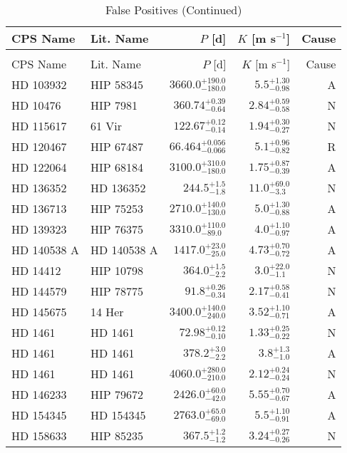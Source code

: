 \begin{longtable*}{llrrr}
\caption{False Positives} \\
\toprule
\midrule

CPS Name & Lit. Name & $P$ [d] & $K$ [m s$^{-1}$] & Cause \\
\endfirsthead
\caption[]{False Positives (Continued)} \\
\toprule
\midrule
CPS Name & Lit. Name & $P$ [d] & $K$ [m s$^{-1}$] & Cause \\
\toprule
\endhead
HD 103932 & HIP 58345 & $3660.0^{+190.0}_{-180.0}$ & $5.5^{+1.30}_{-0.98}$ & A \\
HD 10476 & HIP 7981 & $360.74^{+0.39}_{-0.64}$ & $2.84^{+0.59}_{-0.58}$ & N \\
HD 115617 & 61 Vir & $122.67^{+0.12}_{-0.14}$ & $1.94^{+0.30}_{-0.27}$ & N \\
HD 120467 & HIP 67487 & $66.464^{+0.056}_{-0.066}$ & $5.1^{+0.96}_{-0.82}$ & R \\
HD 122064 & HIP 68184 & $3100.0^{+310.0}_{-180.0}$ & $1.75^{+0.87}_{-0.39}$ & A \\
HD 136352 & HD 136352 & $244.5^{+1.5}_{-1.8}$ & $11.0^{+69.0}_{-3.3}$ & N \\
HD 136713 & HIP 75253 & $2710.0^{+140.0}_{-130.0}$ & $5.0^{+1.30}_{-0.88}$ & A \\
HD 139323 & HIP 76375 & $3310.0^{+110.0}_{-89.0}$ & $4.0^{+1.10}_{-0.97}$ & A \\
HD 140538 A & HD 140538 A & $1417.0^{+23.0}_{-25.0}$ & $4.73^{+0.70}_{-0.72}$ & A \\
HD 14412 & HIP 10798 & $364.0^{+1.5}_{-2.2}$ & $3.0^{+22.0}_{-1.1}$ & N \\
HD 144579 & HIP 78775 & $91.8^{+0.26}_{-0.34}$ & $2.17^{+0.58}_{-0.41}$ & N \\
HD 145675 & 14 Her & $3400.0^{+140.0}_{-240.0}$ & $3.52^{+1.10}_{-0.71}$ & A \\
HD 1461 & HD 1461 & $72.98^{+0.12}_{-0.10}$ & $1.33^{+0.25}_{-0.22}$ & N \\
HD 1461 & HD 1461 & $378.2^{+3.0}_{-2.2}$ & $3.8^{+1.3}_{-1.0}$ & A \\
HD 1461 & HD 1461 & $4060.0^{+280.0}_{-210.0}$ & $2.12^{+0.24}_{-0.24}$ & N \\
HD 146233 & HIP 79672 & $2426.0^{+60.0}_{-42.0}$ & $5.55^{+0.70}_{-0.67}$ & A \\
HD 154345 & HD 154345 & $2763.0^{+65.0}_{-69.0}$ & $5.5^{+1.10}_{-0.91}$ & A \\
HD 158633 & HIP 85235 & $367.5^{+1.2}_{-1.2}$ & $3.24^{+0.27}_{-0.26}$ & N \\

\end{longtable*}
